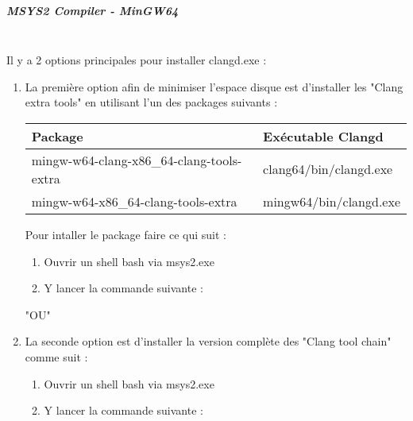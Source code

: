    \subparagraph*{MSYS2 Compiler - MinGW64} \hspace{0pt} \\
   Il y a 2 options principales pour installer clangd.exe :
   \begin{enumerate}[noitemsep]
   \item La première option afin de minimiser l'espace disque est d'installer les "Clang extra tools" en utilisant l'un des packages suivants :       
        {\footnotesize
        \begin{longtable}{|l|l|}\hline
        \textbf{Package}                            & \textbf{Exécutable Clangd}    \\ \hline
        mingw-w64-clang-x86\_64-clang-tools-extra   & clang64/bin/clangd.exe        \\
        mingw-w64-x86\_64-clang-tools-extra         & mingw64/bin/clangd.exe        \\ \hline
        \end{longtable}
        \par}
 
        Pour intaller le package faire ce qui suit :
        \begin{enumerate}[noitemsep]
        \item Ouvrir un shell bash via msys2.exe 
        \item Y lancer la commande suivante : \newline
               \newline
        \end{enumerate}

       "OU" \newline

    \item La seconde option est d'installer la version complète des "Clang tool chain" comme suit :
        \begin{enumerate}[noitemsep]
        \item Ouvrir un shell bash via msys2.exe 
        \item Y lancer la commande suivante : \newline
        \end{enumerate}
    \end{enumerate}


